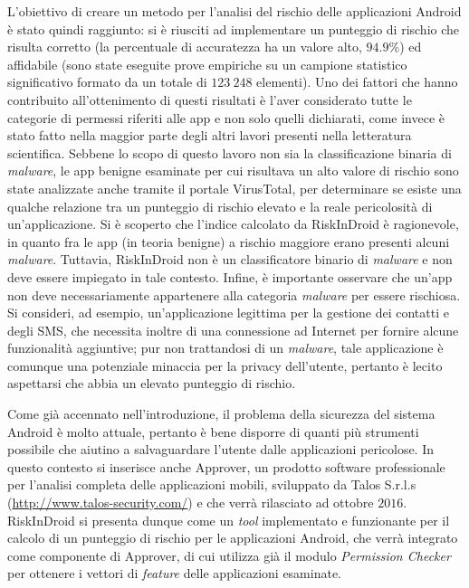 \documentclass[12pt,a4paper,oneside]{article}
\begin{document}
L'obiettivo di creare un metodo per l'analisi del rischio delle applicazioni Android è stato quindi raggiunto: si è riusciti ad implementare un punteggio di rischio che risulta corretto (la percentuale di accuratezza ha un valore alto, $94.9\%$) ed affidabile (sono state eseguite prove empiriche su un campione statistico significativo formato da un totale di $123~248$ elementi). Uno dei fattori che hanno contribuito all'ottenimento di questi risultati è l'aver considerato tutte le categorie di permessi riferiti alle app e non solo quelli dichiarati, come invece è stato fatto nella maggior parte degli altri lavori presenti nella letteratura scientifica. Sebbene lo scopo di questo lavoro non sia la classificazione binaria di \textit{malware}, le app benigne esaminate per cui risultava un alto valore di rischio sono state analizzate anche tramite il portale VirusTotal, per determinare se esiste una qualche relazione tra un punteggio di rischio elevato e la reale pericolosità di un'applicazione. Si è scoperto che l'indice calcolato da RiskInDroid è ragionevole, in quanto fra le app (in teoria benigne) a rischio maggiore erano presenti alcuni \textit{malware}. Tuttavia, RiskInDroid non è un classificatore binario di \textit{malware} e non deve essere impiegato in tale contesto. Infine, è importante osservare che un'app non deve necessariamente appartenere alla categoria \textit{malware} per essere rischiosa. Si consideri, ad esempio, un'applicazione legittima per la gestione dei contatti e degli SMS, che necessita inoltre di una connessione ad Internet per fornire alcune funzionalità aggiuntive; pur non trattandosi di un \textit{malware}, tale applicazione è comunque una potenziale minaccia per la privacy dell'utente, pertanto è lecito aspettarsi che abbia un elevato punteggio di rischio.

Come già accennato nell'introduzione, il problema della sicurezza del sistema Android è molto attuale, pertanto è bene disporre di quanti più strumenti possibile che aiutino a salvaguardare l'utente dalle applicazioni pericolose. In questo contesto si inserisce anche Approver, un prodotto software professionale per l'analisi completa delle applicazioni mobili, sviluppato da Talos S.r.l.s (\url{http://www.talos-security.com/}) e che verrà rilasciato ad ottobre $2016$. RiskInDroid si presenta dunque come un \textit{tool} implementato e funzionante per il calcolo di un punteggio di rischio per le applicazioni Android, che verrà integrato come componente di Approver, di cui utilizza già il modulo \textit{Permission Checker} per ottenere i vettori di \textit{feature} delle applicazioni esaminate.
\end{document}
